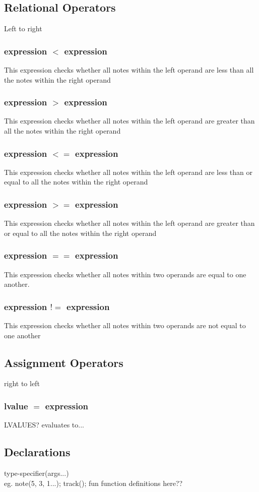 \documentclass[letterpaper]{article}
\begin{document}
\subsection{Relational Operators}
Left to right
\subsubsection{expression $<$ expression}
This expression checks whether all notes within the left operand are less than all the notes within the right operand
\subsubsection{expression $>$ expression}
This expression checks whether all notes within the left operand are greater than all the notes within the right operand
\subsubsection{expression $<=$ expression}
This expression checks whether all notes within the left operand are less than or equal to all the notes within the right operand
\subsubsection{expression $>=$ expression}
This expression checks whether all notes within the left operand are greater than or equal to all the notes within the right operand
\subsubsection{expression $==$ expression}
This expression checks whether all notes within two operands are equal to one another. 
\subsubsection{expression $!=$ expression}
This expression checks whether all notes within two operands are not equal to one another

\subsection{Assignment Operators}
right to left
\subsubsection{lvalue $=$ expression}
LVALUES?
evaluates to...
\subsection{Declarations}
type-specifier(args...)\\
eg. note(5, 3, 1...); track(); fun
function definitions here??
\end{document}
